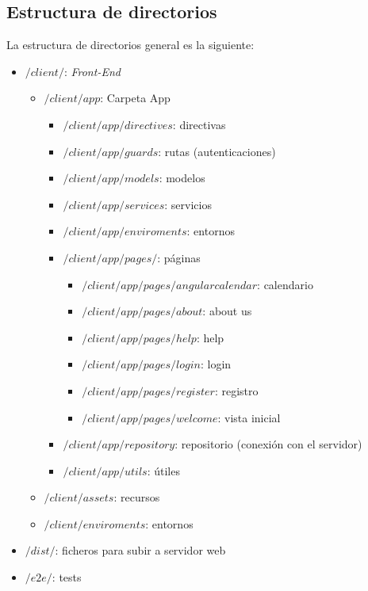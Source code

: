 \subsection{Estructura de directorios }

La estructura de directorios general es la siguiente:


\begin{itemize}
	\item \textbf{$/client/$}: \emph{Front-End} 
	\begin{itemize}
	\item \textbf{$/client/app$}: Carpeta App
		\begin{itemize}
		\item \textbf{$/client/app/ directives$}: directivas
		\item \textbf{$/client/app/ guards$}: rutas (autenticaciones)
		\item \textbf{$/client/app/ models$}: modelos
		\item \textbf{$/client/app/ services$}:  servicios
		\item \textbf{$/client/app/ enviroments$}:  entornos
		\item \textbf{$/client/app/ pages/$}:  páginas
			\begin{itemize}
			\item \textbf{$/client/app/pages/angular calendar $}:  calendario
			\item \textbf{$/client/app/pages/about $}:   about us
			\item \textbf{$/client/app/pages/help $}:   help
			\item \textbf{$/client/app/pages/login $}:  login
			\item \textbf{$/client/app/pages/register $}:   registro
			\item \textbf{$/client/app/pages/welcome $}:   vista inicial
			\end{itemize}
		\item \textbf{$/client/app/repository $}:  repositorio (conexión con el servidor)
		\item \textbf{$/client/app/utils $}:   útiles
		\end{itemize}
	\item \textbf{$/client/assets $}: recursos  
	\item \textbf{$/client/enviroments $}:  entornos
   \end{itemize}
	\item \textbf{$/dist/ $}: ficheros para subir a servidor web
	\item \textbf{$/e2e/ $}: tests

\end{itemize}
